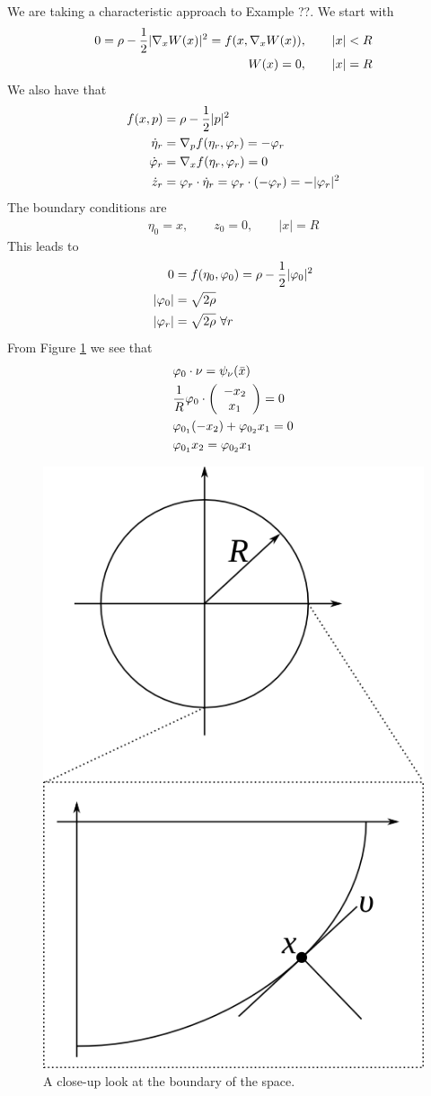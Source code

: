 \begin{example}
We are taking a characteristic approach to Example ??. We start with
\begin{align*}
0 = \rho - \frac{1}{2}|\nabla_xW(x)|^2 = f(x,\nabla_xW(x))&, \qquad |x|<R \\
W(x) = 0&, \qquad |x| = R
\end{align*}
We also have that
\begin{align*}
f(x,p) &= \rho-\frac{1}{2}|p|^2 \\
\dot{\eta}_r &= \nabla_pf(\eta_r,\varphi_r) = -\varphi_r \\
\dot{\varphi}_r &= \nabla_xf(\eta_r,\varphi_r) = 0 \\
\dot{z}_r &= \varphi_r\cdot\dot{\eta}_r = \varphi_r\cdot(-\varphi_r) = -|\varphi_r|^2
\end{align*}
The boundary conditions are
\begin{align*}
\eta_0 = x, \qquad z_0=0, \qquad |x|=R
\end{align*}
This leads to
\begin{align}
\label{eq:15vpr}
0 &= f(\eta_0,\varphi_0) = \rho-\frac{1}{2}|\varphi_0|^2 \nonumber \\
|\varphi_0| &= \sqrt{2\rho} \nonumber \\
|\varphi_r| &= \sqrt{2\rho} ~\forall r
\end{align}
From Figure \ref{fig:15circlezoom} we see that
\begin{align}
\label{eq:15vpo}
&\varphi_0\cdot\nu = \psi_\nu(\bar{x}) \nonumber \\
&\frac{1}{R}\varphi_0\cdot\left(\begin{array}{c} -x_2 \\ x_1 \end{array}\right) = 0 \nonumber \\
&\varphi_{0_1}(-x_2) + \varphi_{0_2}x_1 = 0 \nonumber \\
&\varphi_{0_1}x_2 = \varphi_{0_2}x_1
\end{align}

\begin{figure}[ht!]
	\centering
	\includegraphics[width=.15\textwidth]{images/15circlezoom}
	\caption{A close-up look at the boundary of the space.}
	\label{fig:15circlezoom}
\end{figure}


\end{example}
